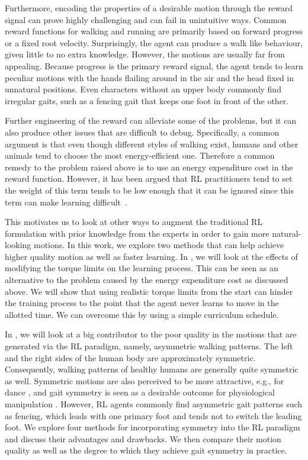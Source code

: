 Furthermore, encoding the properties of a desirable motion through the reward signal can prove highly challenging and can fail in unintuitive ways.
Common reward functions for walking and running are primarily based on forward progress or a fixed root velocity.
Surprisingly, the agent can produce a walk like behaviour, given little to no extra knowledge.
However, the motions are usually far from appealing.
Because progress is the primary reward signal, the agent tends to learn peculiar motions with the hands flailing around in the air and the head fixed in unnatural positions.
Even characters without an upper body commonly find irregular gaits, such as a fencing gait that keeps one foot in front of the other.

Further engineering of the reward
can alleviate some of the problems, but it can also produce other issues that are difficult to debug.
Specifically, a common argument is that even though different styles of walking exist, humans and other animals tend to choose the most energy-efficient one.
Therefore a common remedy to the problem raised above is to use an energy expenditure cost in the reward function.
However, it has been argued that \ac{RL} practitioners tend to set the weight of this term tends to be low enough that it can be ignored since this term can make learning difficult~\cite{Yu-SIGGRAPH-2018}.

This motivates us to look at other ways to augment the traditional \ac{RL} formulation with prior knowledge from the experts in order to gain more natural-looking motions. In this work, we explore two methods that can help achieve higher quality motion as well as faster learning. In , we will look at the effects of modifying the torque limits on the learning process. This can be seen as an alternative to the problem caused by the energy expenditure cost as discussed above. We will show that using realistic torque limits from the start can hinder the training process to the point that the agent never learns to move in the allotted time. We can overcome this by using a simple curriculum schedule.

In , we will look at a big contributor to the poor quality in the motions that are generated via the \ac{RL} paradigm, namely, asymmetric walking patterns. The left and the right sides of the human body are approximately symmetric. Consequently, walking patterns of healthy humans are generally quite symmetric as well. Symmetric motions are also perceived to be more attractive, e.g., for dance \cite{danceSymmetry}, and gait symmetry is seen as a desirable outcome for physiological manipulation \cite{robinson1987use}. However, \ac{RL} agents commonly find asymmetric gait patterns such as fencing, which leads with one primary foot and tends not to switch the leading foot. We explore four methods for incorporating symmetry into the \ac{RL} paradigm and discuss their advantages and drawbacks. We then compare their motion quality as well as the degree to which they achieve gait symmetry in practice.
